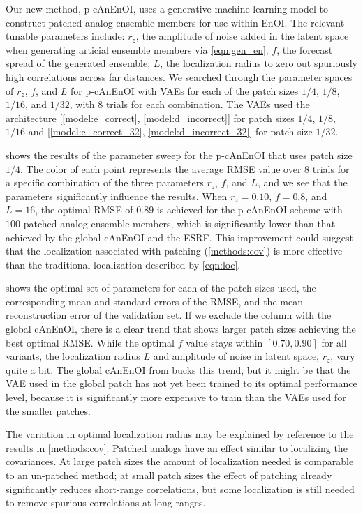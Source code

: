 \documentclass[final,3p]{elsarticle}
\theoremstyle{break}
\begin{document}
Our new method, p-cAnEnOI, uses a generative machine learning model to construct patched-analog ensemble members for use within EnOI. 
The relevant tunable parameters include: $r_z$, the amplitude of noise added in the latent space when generating articial ensemble members via \cref{eqn:gen_en}; $f$, the forecast spread of the generated ensemble; $L$, the localization radius to zero out spuriously high correlations across far distances. 
We searched through the parameter spaces of $r_z$, $f$, and $L$ for p-cAnEnOI with VAEs for each of the patch sizes $1/4$, $1/8$, $1/16$, and $1/32$, with 8 trials for each combination.
The VAEs used the architecture [\cref{model:e_correct}, \cref{model:d_incorrect}] for patch sizes $1/4$, $1/8$, $1/16$ and [\cref{model:e_correct_32}, \cref{model:d_incorrect_32}] for patch size $1/32$. \par

 shows the results of the parameter sweep for the p-cAnEnOI that uses patch size $1/4$.
The color of each point represents the average RMSE value over 8 trials for a specific combination of the three parameters $r_z$, $f$, and $L$, and we see that the parameters significantly influence the results. 
When $r_z=0.10$, $f=0.8$, and $L=16$, the optimal RMSE of $0.89$ is achieved for the p-cAnEnOI scheme with $100$ patched-analog ensemble members, which is significantly lower than that achieved by the global cAnEnOI and the ESRF. 
This improvement could suggest that the localization associated with patching (\cref{methods:cov}) is more effective than the traditional localization described by \cref{eqn:loc}. \par 
 
 shows the optimal set of parameters for each of the patch sizes used, the corresponding mean and standard errors of the RMSE, and the mean reconstruction error of the validation set.
If we exclude the column with the global cAnEnOI, there is a clear trend that shows larger patch sizes achieving the best optimal RMSE.
While the optimal $f$ value stays within $[0.70,0.90]$ for all variants, the localization radius $L$ and amplitude of noise in latent space, $r_z$, vary quite a bit.
The global cAnEnOI from \cite{grooms2020analog} bucks this trend, but it might be that the VAE used in the global patch has not yet been trained to its optimal performance level, because it is significantly more expensive to train than the VAEs used for the smaller patches.

The variation in optimal localization radius may be explained by reference to the results in \cref{methods:cov}.
Patched analogs have an effect similar to localizing the covariances.
At large patch sizes the amount of localization needed is comparable to an un-patched method; at small patch sizes the effect of patching already significantly reduces short-range correlations, but some localization is still needed to remove spurious correlations at long ranges.
\end{document}

